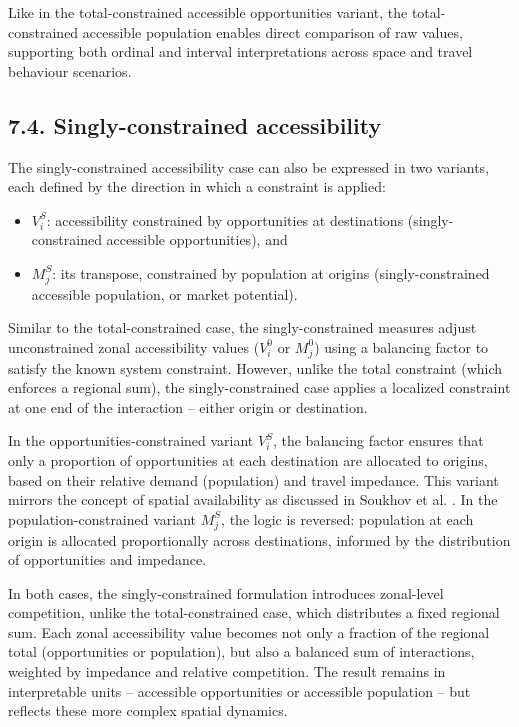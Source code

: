 \documentclass[
  10pt,
  letterpaper,
]{article}
\providecommand{\tightlist}{%
  \setlength{\itemsep}{0pt}\setlength{\parskip}{0pt}}
\begin{document}
Like in the total-constrained accessible opportunities variant, the
total-constrained accessible population enables direct comparison of raw
values, supporting both ordinal and interval interpretations across
space and travel behaviour scenarios.

\subsection{7.4. Singly-constrained
accessibility}\label{singly-constrained-accessibility}

The singly-constrained accessibility case can also be expressed in two
variants, each defined by the direction in which a constraint is
applied:

\begin{itemize}
\tightlist
\item
  \(V_i^S\): accessibility constrained by opportunities at destinations
  (singly-constrained accessible opportunities), and
\item
  \(M_j^S\): its transpose, constrained by population at origins
  (singly-constrained accessible population, or market potential).
\end{itemize}

Similar to the total-constrained case, the singly-constrained measures
adjust unconstrained zonal accessibility values (\(V_i^0\) or \(M_j^0\))
using a balancing factor to satisfy the known system constraint.
However, unlike the total constraint (which enforces a regional sum),
the singly-constrained case applies a localized constraint at one end of
the interaction -- either origin or destination.

In the opportunities-constrained variant \(V_i^S\), the balancing factor
ensures that only a proportion of opportunities at each destination are
allocated to origins, based on their relative demand (population) and
travel impedance. This variant mirrors the concept of spatial
availability as discussed in Soukhov et al.
\citep{soukhovIntroducingSpatialAvailability2023}. In the
population-constrained variant \(M_j^S\), the logic is reversed:
population at each origin is allocated proportionally across
destinations, informed by the distribution of opportunities and
impedance.

In both cases, the singly-constrained formulation introduces zonal-level
competition, unlike the total-constrained case, which distributes a
fixed regional sum. Each zonal accessibility value becomes not only a
fraction of the regional total (opportunities or population), but also a
balanced sum of interactions, weighted by impedance and relative
competition. The result remains in interpretable units -- accessible
opportunities or accessible population -- but reflects these more
complex spatial dynamics.
\end{document}
